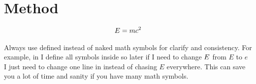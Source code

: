 \section{Method}
\label{sec:method}

\begin{align}
E = m c^2
\label{eqn:emc2}
\end{align}

Always use defined instead of naked math symbols for clarify and consistency.
For example, in  I define all symbols inside  so later if I need to change $E$ from $E$ to $e$ I just need to change one line in  instead of chasing $E$ everywhere.
This can save you a lot of time and sanity if you have many math symbols.



